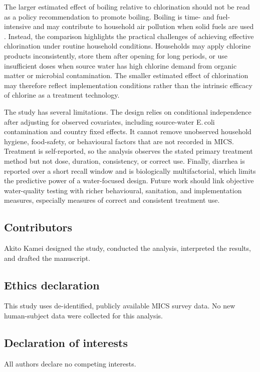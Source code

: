 \documentclass [11pt]{article}
\theoremstyle{plain}
\theoremstyle{definition}
\theoremstyle{remark}
\newcommand{\1}{\bm{1}}
\begin{document}
The larger estimated effect of boiling relative to chlorination should not be read as a policy recommendation to promote boiling. Boiling is time- and fuel-intensive and may contribute to household air pollution when solid fuels are used \citep{floess2025health}. Instead, the comparison highlights the practical challenges of achieving effective chlorination under routine household conditions. Households may apply chlorine products inconsistently, store them after opening for long periods, or use insufficient doses when source water has high chlorine demand from organic matter or microbial contamination. The smaller estimated effect of chlorination may therefore reflect implementation conditions rather than the intrinsic efficacy of chlorine as a treatment technology.

The study has several limitations. The design relies on conditional independence after adjusting for observed covariates, including source-water E.\,coli contamination and country fixed effects. It cannot remove unobserved household hygiene, food-safety, or behavioural factors that are not recorded in MICS. Treatment is self-reported, so the analysis observes the stated primary treatment method but not dose, duration, consistency, or correct use. Finally, diarrhea is reported over a short recall window and is biologically multifactorial, which limits the predictive power of a water-focused design. Future work should link objective water-quality testing with richer behavioural, sanitation, and implementation measures, especially measures of correct and consistent treatment use.

\subsection*{Contributors}
Akito Kamei designed the study, conducted the analysis, interpreted the results, and drafted the manuscript.

\subsection*{Ethics declaration}
This study uses de-identified, publicly available MICS survey data. No new human-subject data were collected for this analysis.

\subsection*{Declaration of interests}  
All authors declare no competing interests.
\end{document}
